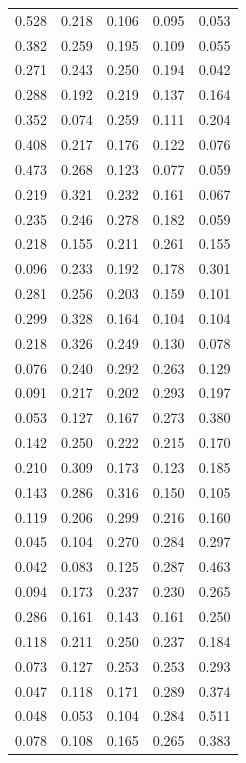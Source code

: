\documentclass[11pt, titlepage]{article}
\begin{document}
\begin{table}
\begin{center}
\begin{tabular}{lllll}\hline
    0.528&0.218&0.106&0.095&0.053\\
    0.382&0.259&0.195&0.109&0.055\\
    0.271&0.243&0.250&0.194&0.042\\
    0.288&0.192&0.219&0.137&0.164\\
    0.352&0.074&0.259&0.111&0.204\\
    \hline
    0.408&0.217&0.176&0.122&0.076\\
    \hline
    0.473&0.268&0.123&0.077&0.059\\
    0.219&0.321&0.232&0.161&0.067\\
    0.235&0.246&0.278&0.182&0.059\\
    0.218&0.155&0.211&0.261&0.155\\
    0.096&0.233&0.192&0.178&0.301\\
    \hline
    0.281&0.256&0.203&0.159&0.101\\
    \hline
    0.299&0.328&0.164&0.104&0.104\\
    0.218&0.326&0.249&0.130&0.078\\
    0.076&0.240&0.292&0.263&0.129\\
    0.091&0.217&0.202&0.293&0.197\\
    0.053&0.127&0.167&0.273&0.380\\
    \hline
    0.142&0.250&0.222&0.215&0.170\\
    \hline
    0.210&0.309&0.173&0.123&0.185\\
    0.143&0.286&0.316&0.150&0.105\\
    0.119&0.206&0.299&0.216&0.160\\
    0.045&0.104&0.270&0.284&0.297\\
    0.042&0.083&0.125&0.287&0.463\\
    \hline
    0.094&0.173&0.237&0.230&0.265\\
    \hline
    0.286&0.161&0.143&0.161&0.250\\
    0.118&0.211&0.250&0.237&0.184\\
    0.073&0.127&0.253&0.253&0.293\\
    0.047&0.118&0.171&0.289&0.374\\
    0.048&0.053&0.104&0.284&0.511\\
    \hline
    0.078&0.108&0.165&0.265&0.383\\
\end{tabular}
\end{center}
\end{table}
\end{document}
